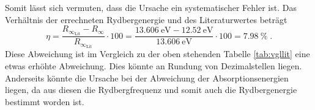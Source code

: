 Somit lässt sich vermuten, dass die Ursache ein systematischer Fehler ist.
Das Verhältnis der errechneten Rydbergenergie und des Literaturwertes beträgt
\begin{equation}
    \eta = \frac{R_{\infty_\text{Lit}}-R_\infty}{R_{\infty_\text{Lit}}} \cdot 100= \frac{\SI{13.606}{\electronvolt} - \SI{12.52}{\electronvolt}}{\SI{13.606}{\electronvolt}} \cdot 100 = \SI{7.98}{\percent} \; \text{.}
\end{equation}
Diese Abweichung ist im Vergleich zu der oben stehenden Tabelle \ref{tab:vgllit} eine etwas erhöhte Abweichung.
Dies könnte an Rundung von Dezimalstellen liegen. Anderseits könnte die Ursache bei der Abweichung der Absorptionsenergien liegen, da aus diesen die Rydbergfrequenz und somit 
auch die Rydbergenergie bestimmt  worden ist.